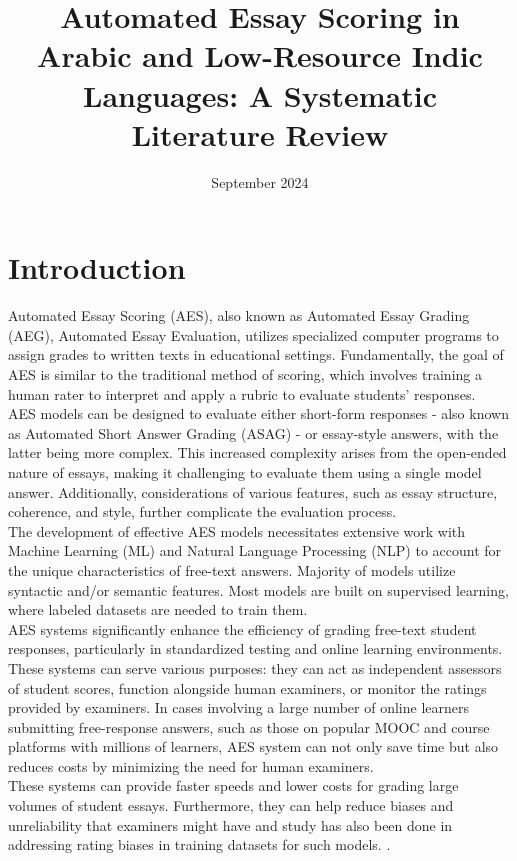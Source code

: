 \documentclass{article}
\title{Automated Essay Scoring in Arabic and Low-Resource Indic Languages: A Systematic Literature Review}
\date{September 2024}
\begin{document}
    
	
	\maketitle
	\section{Introduction}
	Automated Essay Scoring (AES), also known as Automated Essay Grading (AEG), Automated Essay Evaluation, utilizes specialized computer programs to assign grades to written texts in educational settings. Fundamentally, the goal of AES is similar to the traditional method of scoring, which involves training a human rater to interpret and apply a rubric to evaluate students' responses.\\
	
	AES models can be designed to evaluate either short-form responses - also known as Automated Short Answer Grading (ASAG) - or essay-style answers, with the latter being more complex. This increased complexity arises from the open-ended nature of essays, making it challenging to evaluate them using a single model answer. Additionally, considerations of various features, such as essay structure, coherence, and style, further complicate the evaluation process. \\
	
	The development of effective AES models necessitates extensive work with Machine Learning (ML) and Natural Language Processing (NLP) to account for the unique characteristics of free-text answers. Majority of models utilize syntactic and/or semantic features. Most models are built on supervised learning, where labeled datasets are needed to train them.
	\\
	AES systems significantly enhance the efficiency of grading free-text student responses, particularly in standardized testing and online learning environments. These systems can serve various purposes: they can act as independent assessors of student scores, function alongside human examiners, or monitor the ratings provided by examiners. In cases involving a large number of online learners submitting free-response answers, such as those on popular  MOOC and course platforms with millions of learners, AES system can not only save time but also reduces costs by minimizing the need for human examiners. \\
	
	These systems can provide faster speeds and lower costs for grading large volumes of student essays. Furthermore, they can help reduce biases and unreliability that examiners might have \cite{malouff2016bias} and study has also been done in addressing rating biases in training datasets for such models. \cite{amorim2018aesbias}.\\
	
\end{document}
